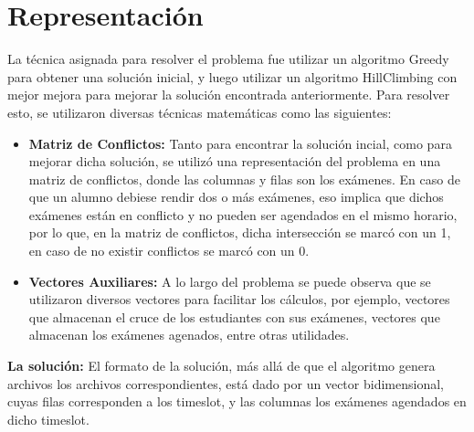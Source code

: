 \section{Representaci\'on}
La técnica asignada para resolver el problema fue utilizar un algoritmo Greedy para obtener una solución inicial, y luego utilizar un algoritmo HillClimbing con mejor mejora para mejorar la solución encontrada anteriormente. Para resolver esto, se utilizaron diversas técnicas matemáticas como las siguientes:
\begin{itemize}
    \item \textbf{Matriz de Conflictos: } Tanto para encontrar la solución incial, como para mejorar dicha solución, se utilizó una representación del problema en una matriz de conflictos, donde las columnas y filas son los exámenes. En caso de que un alumno debiese rendir dos o más exámenes, eso implica que dichos exámenes están en conflicto y no pueden ser agendados en el mismo horario, por lo que, en la matriz de conflictos, dicha intersección se marcó con un 1, en caso de no existir conflictos se marcó con un 0.
    \item \textbf{Vectores Auxiliares: } A lo largo del problema se puede observa que se utilizaron diversos vectores para facilitar los cálculos, por ejemplo, vectores que almacenan el cruce de los estudiantes con sus exámenes, vectores que almacenan los exámenes agenados, entre otras utilidades.
\end{itemize}
\textbf{La solución: } El formato de la solución, más allá de que el algoritmo genera archivos los archivos correspondientes, está dado por un vector bidimensional, cuyas filas corresponden a los timeslot, y las columnas los exámenes agendados en dicho timeslot.


